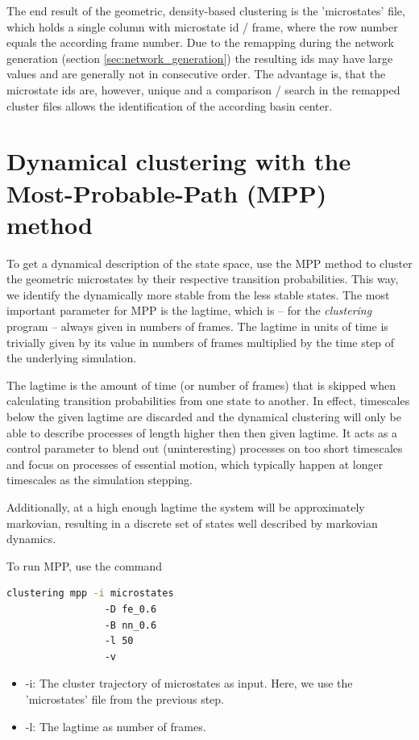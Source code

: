 \documentclass[12pt,a4paper,twoside,english,fleqn]{article}
\begin{document}
The end result of the geometric, density-based clustering is the 'microstates'
file, which holds a single column with microstate id / frame, where the row
number equals the according frame number. Due to the remapping during the
network generation (section \ref{sec:network_generation}) the resulting ids
may have large values and are generally not in consecutive order.
The advantage is, that the microstate ids are, however, unique and a
comparison / search in the remapped cluster files allows the identification of
the according basin center.


\section{Dynamical clustering with the Most-Probable-Path (MPP) method}
To get a dynamical description of the state space, use the MPP method to
cluster the geometric microstates by their respective transition probabilities.
This way, we identify the dynamically more stable from the less stable states.
The most important parameter for MPP is the lagtime, which is -- for the
\emph{clustering} program -- always given in numbers of frames.
The lagtime in units of time is trivially given by its value in numbers of
frames multiplied by the time step of the underlying simulation.

The lagtime is the amount of time (or number of frames) that is skipped when
calculating transition probabilities from one state to another.
In effect, timescales below the given lagtime are discarded and the dynamical
clustering will only be able to describe processes of length higher then then
given lagtime. It acts as a control parameter to blend out (uninteresting)
processes on too short timescales and focus on processes of essential motion,
which typically happen at longer timescales as the simulation stepping.

Additionally, at a high enough lagtime the system will be approximately
markovian, resulting in a discrete set of states well described by markovian
dynamics.

To run MPP, use the command
\begin{lstlisting}[language=bash,basicstyle=\ttfamily]
  clustering mpp -i microstates
                 -D fe_0.6
                 -B nn_0.6
                 -l 50
                 -v
\end{lstlisting}

\begin{itemize}
  \item -i: The cluster trajectory of microstates as input. Here, we use the
            'microstates' file from the previous step.
  \item -l: The lagtime as number of frames.
\end{itemize}
\end{document}
